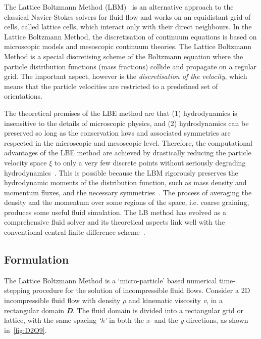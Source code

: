 The Lattice Boltzmann Method
(LBM)~\citep{He1997a,He1997b,Chen1998,Mei2000,Han2007,Zhou2012} is an
alternative approach to the classical Navier-Stokes solvers for fluid flow and 
works on an equidistant grid of cells, called lattice cells, which interact 
only with their direct neighbours. In the Lattice Boltzmann Method, the 
discretisation of continuum equations is based on microscopic models and 
mesoscopic continuum theories. The Lattice Boltzmann Method is a special 
discretising scheme of the Boltzmann equation where the particle distribution 
functions (mass fractions) collide and propagate on a regular grid. The 
important aspect, however is the \textit{discretisation of the velocity}, which 
means that the particle velocities are restricted to a predefined set of 
orientations.

The theoretical premises of the LBE method are that (1) hydrodynamics is 
insensitive to the details of microscopic physics, and (2) hydrodynamics can be 
preserved so long as the conservation laws and associated symmetries are 
respected in the microscopic and mesoscopic level. Therefore, the computational 
advantages of the LBE method are achieved by drastically reducing the particle 
velocity space $\xi$ to only a very few discrete points without seriously 
degrading hydrodynamics~\citep{Mei2000}. This is possible because the LBM 
rigorously preserves the hydrodynamic moments of the distribution function, 
such as mass density and momentum fluxes, and the necessary 
symmetries~\citep{He1997a,He1997b}. The process of averaging the density and 
the momentum over some regions of the space, i.e. coarse graining, produces 
some useful fluid simulation. The LB method has evolved as a comprehensive 
fluid solver and its theoretical aspects link well with the conventional 
central finite difference scheme~\citep{Cook2004}.

\subsection{Formulation}
The Lattice Boltzmann Method is a `micro-particle' based numerical 
time-stepping procedure for the solution of incompressible fluid flows. 
Consider a 2D incompressible fluid flow with density $\rho$ and kinematic 
viscosity \textit{v}, in a rectangular domain \textit{\textbf{D}}. The fluid 
domain is divided into a rectangular grid or lattice, with the same spacing 
\textit{`h'} in both the \textit{x-} and the \textit{y-}directions, as shown 
in~\cref{fig:D2Q9}. 

